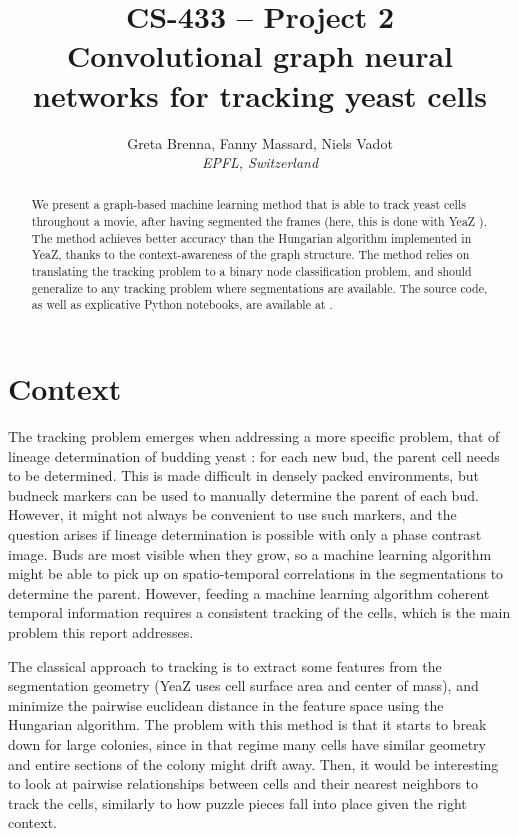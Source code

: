 \documentclass[10pt,conference,compsocconf,a4paper]{IEEEtran}
\begin{document}
\title{CS-433 -- Project 2\\Convolutional graph neural networks for tracking yeast cells}

\author{
	Greta Brenna, Fanny Massard, Niels Vadot\\
	\textit{EPFL, Switzerland}
}

\maketitle

\begin{abstract}
	We present a graph-based machine learning method that is able to track yeast cells throughout a movie, after having segmented the frames (here, this is done with YeaZ \cite{dietler_convolutional_2020}). The method achieves better accuracy than the Hungarian algorithm implemented in YeaZ, thanks to the context-awareness of the graph structure. The method relies on translating the tracking problem to a binary node classification problem, and should generalize to any tracking problem where segmentations are available. The source code, as well as explicative Python notebooks, are available at \cite{vadot_cs-433_2021}.
\end{abstract}


\section{Context}

	The tracking problem emerges when addressing a more specific problem, that of lineage determination of budding yeast : for each new bud, the parent cell needs to be determined. This is made difficult in densely packed environments, but budneck markers can be used to manually determine the parent of each bud. However, it might not always be convenient to use such markers, and the question arises if lineage determination is possible with only a phase contrast image. Buds are most visible when they grow, so a machine learning algorithm might be able to pick up on spatio-temporal correlations in the segmentations to determine the parent. However, feeding a machine learning algorithm coherent temporal information requires a consistent tracking of the cells, which is the main problem this report addresses.

	The classical approach to tracking is to extract some features from the segmentation geometry (YeaZ uses cell surface area and center of mass), and minimize the pairwise euclidean distance in the feature space using the Hungarian algorithm. The problem with this method is that it starts to break down for large colonies, since in that regime many cells have similar geometry and entire sections of the colony might drift away. Then, it would be interesting to look at pairwise relationships between cells and their nearest neighbors to track the cells, similarly to how puzzle pieces fall into place given the right context.
\end{document}
